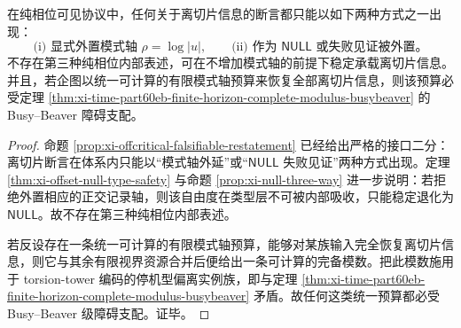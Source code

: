 \begin{theorem}[纯相位制度下离切片信息的二歧结构]\label{thm:xi-time-part60eb-pure-phase-offslice-bifurcation}
在纯相位可见协议中，任何关于离切片信息的断言都只能以如下两种方式之一出现：
\[
\text{(i) 显式外置模式轴 }\rho=\log|u|,\qquad
\text{(ii) 作为 }\mathsf{NULL}\text{ 或失败见证被外置。}
\]
不存在第三种纯相位内部表述，可在不增加模式轴的前提下稳定承载离切片信息。并且，若企图以统一可计算的有限模式轴预算来恢复全部离切片信息，则该预算必受定理 \ref{thm:xi-time-part60eb-finite-horizon-complete-modulus-busybeaver} 的 Busy--Beaver 障碍支配。
\end{theorem}
\begin{proof}
命题 \ref{prop:xi-offcritical-falsifiable-restatement} 已经给出严格的接口二分：离切片断言在体系内只能以“模式轴外延”或“\(\mathsf{NULL}\) 失败见证”两种方式出现。定理 \ref{thm:xi-offset-null-type-safety} 与命题 \ref{prop:xi-null-three-way} 进一步说明：若拒绝外置相应的正交记录轴，则该自由度在类型层不可被内部吸收，只能稳定退化为 \(\mathsf{NULL}\)。故不存在第三种纯相位内部表述。

若反设存在一条统一可计算的有限模式轴预算，能够对某族输入完全恢复离切片信息，则它与其余有限视界资源合并后便给出一条可计算的完备模数。把此模数施用于 torsion-tower 编码的停机型偏离实例族，即与定理 \ref{thm:xi-time-part60eb-finite-horizon-complete-modulus-busybeaver} 矛盾。故任何这类统一预算都必受 Busy--Beaver 级障碍支配。证毕。
\end{proof}

